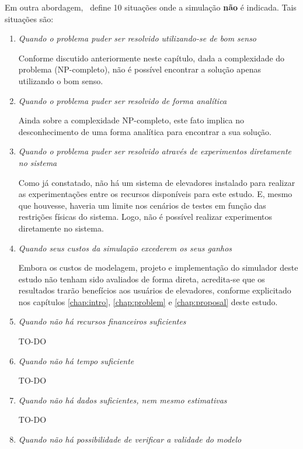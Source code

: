 Em outra abordagem,~\cite{BanksGibson} define 10 situações onde a simulação
\textbf{não} é indicada. Tais situações são:

\begin{enumerate}
\item \textit{Quando o problema puder ser resolvido utilizando-se de bom senso}

Conforme discutido anteriormente neste capítulo, dada a complexidade do problema
(NP-completo), não é possível encontrar a solução apenas utilizando o bom senso.

\item \textit{Quando o problema puder ser resolvido de forma analítica}

Ainda sobre a complexidade NP-completo, este fato implica no desconhecimento de
uma forma analítica para encontrar a sua solução.

\item \textit{Quando o problema puder ser resolvido através de experimentos
diretamente no sistema}

Como já constatado, não há um sistema de elevadores instalado para realizar as
experimentações entre os recursos disponíveis para este estudo. E, mesmo que
houvesse, haveria um limite nos cenários de testes em função das restrições
físicas do sistema. Logo, não é possível realizar experimentos diretamente no
sistema.

\item \textit{Quando seus custos da simulação excederem os seus ganhos}

Embora os custos de modelagem, projeto e implementação do simulador deste estudo
não tenham sido avaliados de forma direta, acredita-se que os resultados trarão
benefícios aos usuários de elevadores, conforme explicitado nos capítulos
\ref{chap:intro}, \ref{chap:problem} e \ref{chap:proposal} deste estudo.

\item \textit{Quando não há recursos financeiros suficientes}

TO-DO %

\item \textit{Quando não há tempo suficiente}

TO-DO %

\item \textit{Quando não há dados suficientes, nem mesmo estimativas}

TO-DO %

\item \textit{Quando não há possibilidade de verificar a validade do modelo}


\end{enumerate}

